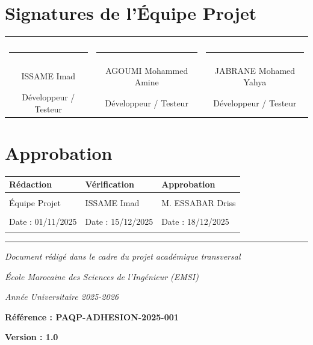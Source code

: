 \documentclass[12pt,a4paper]{report}
\begin{document}
\vspace{2cm}

\section*{Signatures de l'Équipe Projet}

\vspace{1cm}

\begin{center}
\begin{tabular}{ccc}
& & \\
& & \\
\rule{5cm}{0.4pt} & \rule{5cm}{0.4pt} & \rule{5cm}{0.4pt} \\
ISSAME Imad & AGOUMI Mohammed Amine & JABRANE Mohamed Yahya \\
Développeur / Testeur & Développeur / Testeur & Développeur / Testeur \\
\end{tabular}
\end{center}

\vspace{2cm}

\section*{Approbation}

\begin{center}
\begin{tabular}{|l|l|l|}
    \hline
    \textbf{Rédaction} & \textbf{Vérification} & \textbf{Approbation} \\
    \hline
    & & \\
    Équipe Projet & ISSAME Imad & M. ESSABAR Driss \\
    & & \\
    Date : 01/11/2025 & Date : 15/12/2025 & Date : 18/12/2025 \\
    & & \\
    \hline
\end{tabular}
\end{center}

\vspace{2cm}

\begin{center}
\rule{8cm}{0.4pt}

\vspace{0.5cm}

\textit{Document rédigé dans le cadre du projet académique transversal}

\textit{École Marocaine des Sciences de l'Ingénieur (EMSI)}

\textit{Année Universitaire 2025-2026}

\vspace{0.5cm}

\textbf{Référence : PAQP-ADHESION-2025-001}

\textbf{Version : 1.0}
\end{center}
\end{document}
